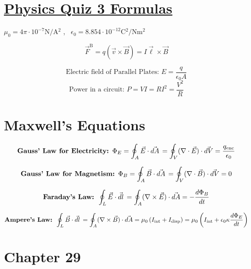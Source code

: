 \documentclass[fleqn,12pt]{article}
\begin{document}
\setlength{\abovedisplayskip}{1pt}
\setlength{\belowdisplayskip}{1pt}
\section*{\underline{Physics Quiz 3 Formulas}}
$ \mu_0 = 4\pi \cdot 10^{-7} \si{\newton\per\ampere^2}$ , \, 
$\epsilon_0 = 8.854 \cdot 10^{-12} \si{\coulomb^2\per\newton\meter^2}$

\begin{equation}
  \vec{F}^\mathrm{B} = q(\vec{v} \times \vec{B}) = I\vec{\ell} \times \vec{B}
\end{equation}

$$\textrm{Electric field of Parallel Plates: } E = \frac{q}{\epsilon_0A}$$
$$\textrm{Power in a circuit: } P = VI = RI^2 = \frac{V^2}{R}$$

\section*{Maxwell's Equations}
\begin{equation} \label{eq1}
 \mbox{\textbf{Gauss' Law for Electricity: }}\Phi_{E} = 
    \oint_A \vec{E} \cdot \vec{dA} \, = \oint_V ( \nabla \cdot \vec{E}) \cdot \vec{dV}
= \frac{q_\mathrm{enc}}{\epsilon_0}
\end{equation}

\begin{equation} \label{eq1}
 \mbox{\textbf{Gauss' Law for Magnetism: }}\Phi_{B} = 
    \oint_A \vec{B} \cdot \vec{dA} \, = \oint_V ( \nabla \cdot \vec{B}) \cdot \vec{dV}
= 0
\end{equation}

\begin{equation} \label{eq1}
 \mbox{\textbf{Faraday's Law: }}
    \oint_L \vec{E} \cdot \vec{dl} \, = \oint_A ( \nabla \times \vec{E}) \cdot \vec{dA}
= - \frac{d\Phi_{B}}{dt}
\end{equation}

\begin{equation} \label{eq1}
 \mbox{\textbf{Ampere's Law: }}
    \oint_L \vec{B} \cdot \vec{dl} \, = \oint_A ( \nabla \times \vec{B}) \cdot \vec{dA} = \mu_{0}\left(I_\mathrm{int} + I_\mathrm{disp}\right)
= \mu_{0}\left(I_\mathrm{int} + \epsilon_{0}\kappa\frac{d\Phi_{E}}{dt}\right) 
\end{equation}

\section*{Chapter 29}
\end{document}
